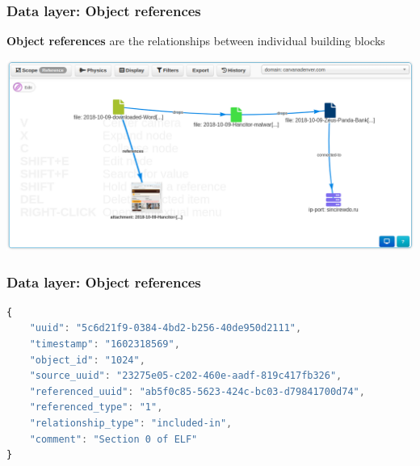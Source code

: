 \begin{frame}[fragile]
    \frametitle{Data layer: Object references}
    {\bf Object references} are the relationships between individual building blocks
    \begin{center}
        \includegraphics[width=1.0\linewidth]{screenshots/eventgraph.png}
    \end{center}
\end{frame}

\begin{frame}[fragile]
    \frametitle{Data layer: Object references}
    \begin{lstlisting}[language=javascript,firstnumber=1]
{
    "uuid": "5c6d21f9-0384-4bd2-b256-40de950d2111",
    "timestamp": "1602318569",
    "object_id": "1024",
    "source_uuid": "23275e05-c202-460e-aadf-819c417fb326",
    "referenced_uuid": "ab5f0c85-5623-424c-bc03-d79841700d74",
    "referenced_type": "1",
    "relationship_type": "included-in",
    "comment": "Section 0 of ELF"
}
\end{lstlisting}
\end{frame}

